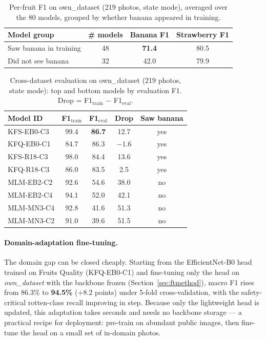 \documentclass[conference]{IEEEtran}
\begin{document}
\begin{table}[h]
\centering
\caption{Per-fruit F1 on own\_dataset (219 photos, state mode), averaged
over the 80 models, grouped by whether banana appeared in training.}
\label{tab:perfruit}
\setlength{\tabcolsep}{5pt}
\begin{tabular}{lccc}
\toprule
\textbf{Model group} & \textbf{\# models} & \textbf{Banana F1} & \textbf{Strawberry F1} \\
\midrule
Saw banana in training & 48 & \textbf{71.4} & 80.5 \\
Did not see banana     & 32 & 42.0 & 79.9 \\
\bottomrule
\end{tabular}
\end{table}

\begin{table}[h]
\centering
\caption{Cross-dataset evaluation on own\_dataset (219 photos, state mode):
top and bottom models by evaluation F1.
Drop = F1$_\text{train}$ $-$ F1$_\text{eval}$.}
\label{tab:domain}
\setlength{\tabcolsep}{4pt}
\begin{tabular}{lcccc}
\toprule
\textbf{Model ID} & \textbf{F1$_\text{train}$} & \textbf{F1$_\text{eval}$}
    & \textbf{Drop} & \textbf{Saw banana} \\
\midrule
KFS-EB0-C3 & 99.4 & \textbf{86.7} & 12.7 & yes \\
KFQ-EB0-C1 & 84.7 & 86.3 & $-1.6$ & yes \\
KFS-R18-C3 & 98.0 & 84.4 & 13.6 & yes \\
KFQ-R18-C3 & 86.0 & 83.5 & 2.5 & yes \\
\midrule
MLM-EB2-C2 & 92.6 & 54.6 & 38.0 & no \\
MLM-EB2-C4 & 94.1 & 52.0 & 42.1 & no \\
MLM-MN3-C4 & 92.8 & 41.6 & 51.3 & no \\
MLM-MN3-C2 & 91.0 & 39.6 & 51.5 & no \\
\bottomrule
\end{tabular}
\end{table}

\paragraph{Domain-adaptation fine-tuning.}
The domain gap can be closed cheaply.
Starting from the EfficientNet-B0 head trained on Fruits Quality
(KFQ-EB0-C1) and fine-tuning only the head on \textit{own\_dataset} with
the backbone frozen (Section~\ref{sec:ftmethod}), macro F1 rises from
86.3\% to \textbf{94.5\%} ($+8.2$ points) under 5-fold cross-validation,
with the safety-critical rotten-class recall improving in step.
Because only the lightweight head is updated, this adaptation takes seconds
and needs no backbone storage --- a practical recipe for deployment:
pre-train on abundant public images, then fine-tune the head on a small
set of in-domain photos.
\end{document}
